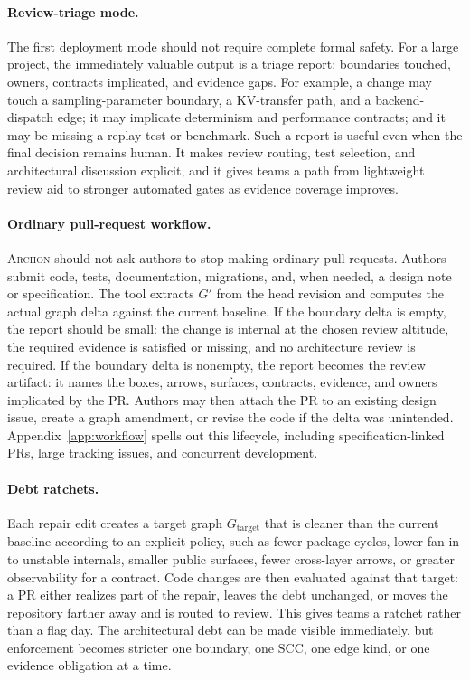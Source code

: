 \documentclass[sigconf,review,anonymous]{acmart}
\theoremstyle{plain}
\theoremstyle{definition}
\begin{document}
\paragraph{Review-triage mode.}
The first deployment mode should not require complete formal safety. For a
large project, the immediately valuable output is a triage report: boundaries
touched, owners, contracts implicated, and evidence gaps.
For example, a change may touch a sampling-parameter boundary, a KV-transfer
path, and a backend-dispatch edge; it may implicate determinism and performance
contracts; and it may be missing a replay test or benchmark. Such a report is
useful even when the final decision remains human. It makes review routing,
test selection, and architectural discussion explicit, and it gives teams a
path from lightweight review aid to stronger automated gates as evidence
coverage improves.

\paragraph{Ordinary pull-request workflow.}
\textsc{Archon} should not ask authors to stop making ordinary pull requests.
Authors submit code, tests, documentation, migrations, and, when needed, a
design note or specification. The tool extracts $G'$ from the head revision and
computes the actual graph delta against the current baseline. If the boundary
delta is empty, the report should be small: the change is internal at the chosen
review altitude, the required evidence is satisfied or missing, and no
architecture review is required. If the boundary delta is nonempty, the report
becomes the review artifact: it names the boxes, arrows, surfaces, contracts,
evidence, and owners implicated by the PR. Authors may then attach the PR to an
existing design issue, create a graph amendment, or revise the code if the delta
was unintended. Appendix~\ref{app:workflow} spells out this lifecycle, including
specification-linked PRs, large tracking issues, and concurrent development.

\paragraph{Debt ratchets.}
Each repair edit creates a target graph $G_{\mathrm{target}}$ that is cleaner
than the current baseline according to an explicit policy, such as fewer package
cycles, lower fan-in to unstable internals, smaller public surfaces, fewer
cross-layer arrows, or greater observability for a contract. Code changes are
then evaluated against that target: a PR either realizes part of the repair,
leaves the debt unchanged, or moves the repository farther away and is routed to
review. This gives teams a ratchet rather than a flag day. The architectural
debt can be made visible immediately, but enforcement becomes stricter one
boundary, one SCC, one edge kind, or one evidence obligation at a time.
\end{document}
